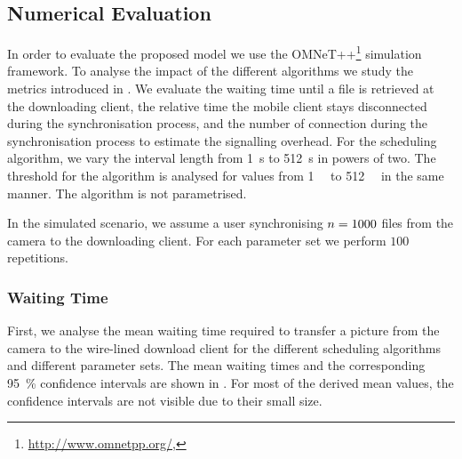 \subsection{Numerical Evaluation}\label{sec:application:cloud_file_synchronisation:numerical_evaluation}
In order to evaluate the proposed model we use the OMNeT++\footnote{\url{http://www.omnetpp.org/}, \accessed} simulation framework.
To analyse the impact of the different algorithms we study the metrics introduced in .
We evaluate the waiting time \sojournTime until a file is retrieved at the downloading client, the relative time the mobile client stays disconnected \relativeDisconnectedTime during the synchronisation process, and the number of connection \connectionCount during the synchronisation process to estimate the signalling overhead.
For the \algointerval scheduling algorithm, we vary the interval length \thresholdInterval from \SI{1}{\second} to \SI{512}{\second} in powers of two.
The threshold \thresholdSize for the \algosize algorithm is analysed for values from \SI{1}{\mega\byte} to \SI{512}{\mega\byte} in the same manner.
The \algoimmediate algorithm is not parametrised.

In the simulated scenario, we assume a user synchronising \(n = 1000\) files from the camera to the downloading client.
For each parameter set we perform \(100\) repetitions.

\subsubsection*{Waiting Time}\label{sec:application:cloud_file_synchronisation:numerical_evaluation:waiting_time}
First, we analyse the mean waiting time \sojournTime required to transfer a picture from the camera to the wire-lined download client for the different scheduling algorithms and different parameter sets.
The mean waiting times \sojournTime and the corresponding \SI{95}{\percent} confidence intervals are shown in .
For most of the derived mean values, the confidence intervals are not visible due to their small size.

